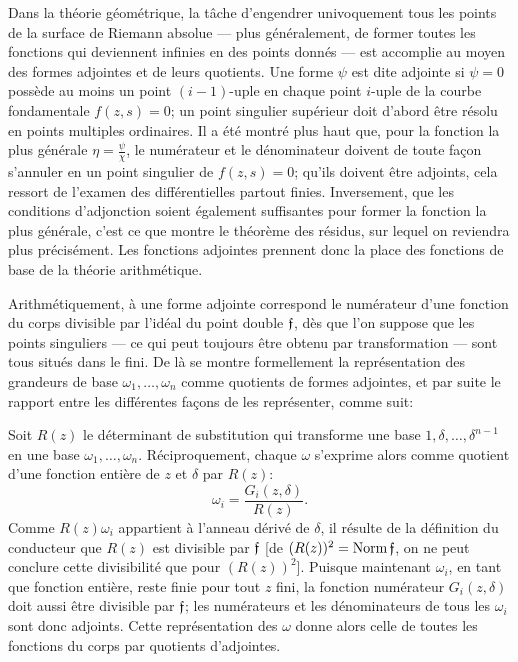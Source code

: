 Dans la théorie géométrique, la tâche d'engendrer univoquement tous les points de la surface de Riemann absolue --- plus généralement, de former toutes les fonctions qui deviennent infinies en des points donnés --- est accomplie au moyen des formes adjointes et de leurs quotients. Une forme \(\psi\) est dite adjointe si \(\psi=0\) possède au moins un point \((i-1)\)-uple en chaque point \(i\)-uple de la courbe fondamentale \(f(z,s)=0\); un point singulier supérieur doit d'abord être résolu en points multiples ordinaires. Il a été montré plus haut que, pour la fonction la plus générale \(\eta=\frac{\psi}{\chi}\), le numérateur et le dénominateur doivent de toute façon s'annuler en un point singulier de \(f(z,s)=0\); qu'ils doivent être adjoints, cela ressort de l'examen des différentielles partout finies. Inversement, que les conditions d'adjonction soient également suffisantes pour former la fonction la plus générale, c'est ce que montre le \og{}théorème des résidus\fg{}, sur lequel on reviendra plus précisément. Les fonctions adjointes prennent donc la place des fonctions de base de la théorie arithmétique.

Arithmétiquement, à une forme adjointe correspond le numérateur d'une fonction du corps divisible par l'\og{}idéal du point double\fg{} \(\mathfrak f\), dès que l'on suppose que les points singuliers --- ce qui peut toujours être obtenu par transformation --- sont tous situés dans le fini. De là se montre formellement la représentation des grandeurs de base \(\omega_1,
\ldots,\omega_n\) comme quotients de formes adjointes, et par suite le rapport entre les différentes façons de les représenter, comme suit:

Soit \(R(z)\) le déterminant de substitution qui transforme une base \(1,\delta,\ldots,\delta^{n-1}\) en une base \(\omega_1,
\ldots,\omega_n\). Réciproquement, chaque \(\omega\) s'exprime alors comme quotient d'une fonction entière de \(z\) et \(\delta\) par \(R(z)\):
\[
\omega_i=\frac{G_i(z,\delta)}{R(z)}.
\]
Comme \(R(z)\omega_i\) appartient à l'anneau dérivé de \(\delta\), il résulte de la définition du conducteur que \(R(z)\) est divisible par \(\mathfrak f\) [de \((R(z))^2=\operatorname{Norm}\mathfrak f\), on ne peut conclure cette divisibilité que pour \((R(z))^2\)]. Puisque maintenant \(\omega_i\), en tant que fonction entière, reste finie pour tout \(z\) fini, la fonction numérateur \(G_i(z,\delta)\) doit aussi être divisible par \(\mathfrak f\); les numérateurs et les dénominateurs de tous les \(\omega_i\) sont donc adjoints. Cette représentation des \(\omega\) donne alors celle de toutes les fonctions du corps par quotients d'adjointes.

